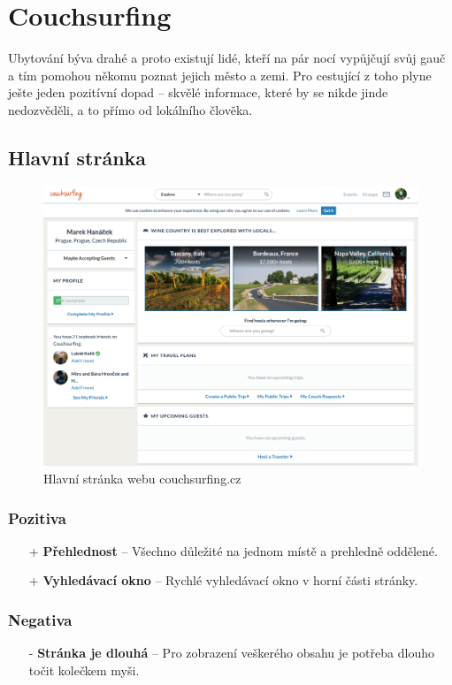 \section{Couchsurfing}
\label{chap:couchsurfing}

Ubytování býva drahé a proto existují lidé, kteří na pár nocí vypůjčují svůj gauč a tím pomohou někomu poznat jejich město a zemi. Pro cestující z toho plyne ješte jeden pozitívní dopad -- skvělé informace, které by se nikde jinde nedozvěděli, a to přímo od lokálního člověka.\\

\subsection{Hlavní stránka}
\begin{figure}[h]
    \centering
    \includegraphics[width=1.0\textwidth]{media/couchsurfing/homepage.png}
    \caption{Hlavní stránka webu couchsurfing.cz}
    \label{fig:couchsurfing:homepage}
\end{figure}
\subsubsection*{Pozitiva}
\begin{itemize}
    \item[+] \textbf{Přehlednost} -- Všechno důležité na jednom místě a prehledně oddělené.
    \item[+] \textbf{Vyhledávací okno} -- Rychlé vyhledávací okno v horní části stránky.
\end{itemize}
\subsubsection*{Negativa}
\begin{itemize}
    \item[-] \textbf{Stránka je dlouhá} -- Pro zobrazení veškerého obsahu je potřeba dlouho točit kolečkem myši.
\end{itemize}


